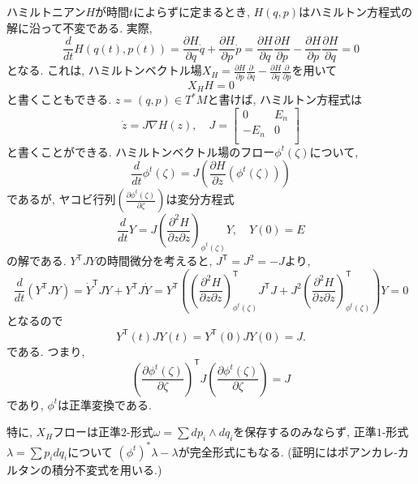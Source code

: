 \documentclass[a4paper]{ujarticle}
\numberwithin{equation}{section}
\theoremstyle{definition}
\begin{document}
        ハミルトニアン$H$が時間$t$によらずに定まるとき, $H(q, p)$はハミルトン方程式の解に沿って不変である.
        実際,
        \[
            \frac{d}{d t} H(q(t), p(t)) = \frac{\partial H}{\partial q} \dot{q} + \frac{\partial H}{\partial p} \dot{p} = \frac{\partial H}{\partial q} \frac{\partial H}{\partial p} - \frac{\partial H}{\partial p} \frac{\partial H}{\partial q} = 0
        \] 
        となる. これは, ハミルトンベクトル場$X_H = \frac{\partial H}{\partial p} \frac{\partial}{\partial q} - \frac{\partial H}{\partial q} \frac{\partial}{\partial p}$を用いて
        \[
            X_H H = 0
        \]
        と書くこともできる. 
        $z = (q, p) \in T^{*}M$と書けば, ハミルトン方程式は
        \[
            \dot{z} = J \nabla H(z), 
            \quad J = 
            \begin{bmatrix}
                0 & E_n \\
                -E_n & 0 \\
            \end{bmatrix}
        \]
        と書くことができる.
        ハミルトンベクトル場のフロー$\phi^{t}(\zeta)$について,
        \[
            \frac{d}{d t} \phi^{t}(\zeta) = J \left(\frac{\partial H}{\partial z}(\phi^{t}(\zeta))\right) 
        \] 
        であるが,
        ヤコビ行列$\displaystyle \left( \frac{\partial \phi^{t}(\zeta)}{\partial \zeta} \right)$は変分方程式
        \[
            \frac{d}{d t} Y = J \left(\frac{\partial^2 H}{\partial z \partial z}\right)_{\phi^{t}(\zeta)} Y, \quad Y(0) = E
        \]
        の解である. 
        $Y^{\mathsf{T}} J Y$の時間微分を考えると, $J^{\mathsf{T}} = J^2 = - J$より,
        \[
            \frac{d}{d t}(Y^{\mathsf{T}} J Y) = \dot{Y}^{\mathsf{T}} J Y + Y^{\mathsf{T}} J \dot{Y} = Y^{\mathsf{T}}(\left(\frac{\partial^2 H}{\partial z \partial z}\right)_{\phi^{t}(\zeta)}^{\mathsf{T}} J^{\mathsf{T}}J + J^2 \left(\frac{\partial^2 H}{\partial z \partial z}\right)_{\phi^{t}(\zeta)}^{\mathsf{T}} )Y = 0
        \]
        となるので
        \[
            Y^{\mathsf{T}}(t) J Y(t) = Y^{\mathsf{T}}(0) J Y(0) = J.
        \]
        である. つまり,
        \[
            \left( \frac{\partial \phi^{t}(\zeta)}{\partial \zeta} \right)^{\mathsf{T}} J \left( \frac{\partial \phi^{t}(\zeta)}{\partial \zeta} \right) = J
        \]
        であり, $\phi^{t}$は正準変換である.

        特に, $X_H$フローは正準$2$-形式$\omega = \sum dp_i \wedge dq_i$を保存するのみならず, 
        正準$1$-形式$\lambda = \sum p_i d q_i$について
        $(\phi^{t})^{*}\lambda - \lambda$が完全形式にもなる. (証明にはポアンカレ-カルタンの積分不変式を用いる.)
\end{document}
